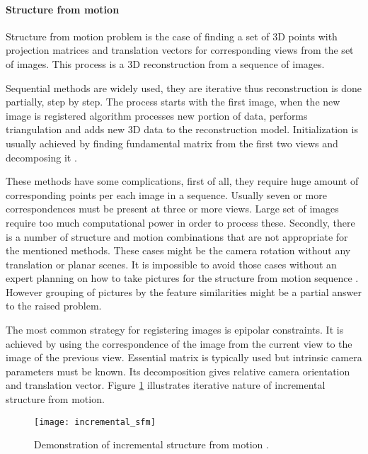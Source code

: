 \documentclass[../../../../main]{subfiles}
\begin{document}
\paragraph{Structure from motion}

Structure from motion problem is the case of finding a set of 3D points with projection matrices and translation vectors for corresponding views from the set of images. This process is a 3D reconstruction from a sequence of images.

Sequential methods are widely used, they are iterative thus reconstruction is done partially, step by step. The process starts with the first image, when the new image is registered algorithm processes new portion of data, performs triangulation and adds new 3D data to the reconstruction model. Initialization is usually achieved by finding fundamental matrix from the first two views and decomposing it \cite{RichardSzeliski2010}.

These methods have some complications, first of all, they require huge amount of corresponding points per each image in a sequence. Usually seven or more correspondences must be present at three or more views. Large set of images require too much computational power in order to process these. Secondly, there is a number of structure and motion combinations that are not appropriate for the mentioned methods. These cases might be the camera rotation without any translation or planar scenes. It is impossible to avoid those cases without an expert planning on how to take pictures for the structure from motion sequence \cite{sfm_theia}. However grouping of pictures by the feature similarities might be a partial answer to the raised problem.

The most common strategy for registering images is epipolar constraints. It is achieved by using the correspondence of the image from the current view to the image of the previous view. Essential matrix is typically used but intrinsic camera parameters must be known. Its decomposition gives relative camera orientation and translation vector. Figure \ref{fig:incrementalSfm} illustrates iterative nature of incremental structure from motion.

\begin{figure} [ht]
    \begin{center}
        \texttt{[image: incremental\_sfm]}
        \caption{Demonstration of incremental structure from motion \cite{sfm_theia}.}
        \label{fig:incrementalSfm}
    \end{center}
\end{figure}
\end{document}
